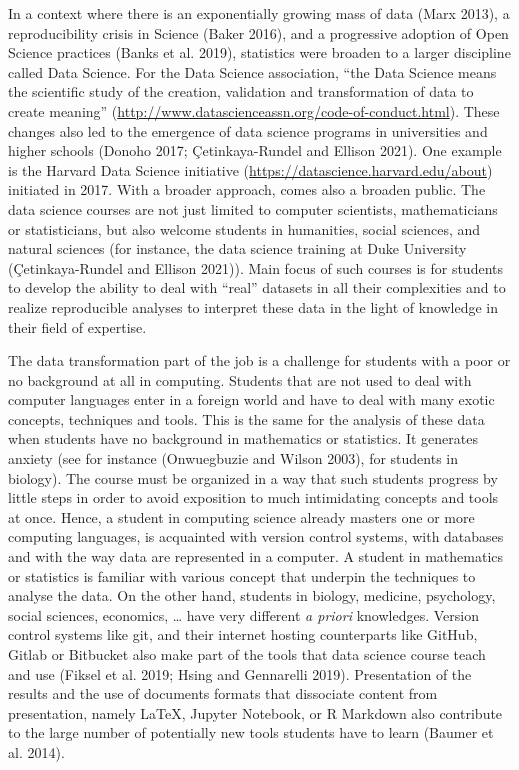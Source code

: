 \documentclass[
]{article}
\begin{document}
In a context where there is an exponentially growing mass of data (Marx
2013), a reproducibility crisis in Science (Baker 2016), and a
progressive adoption of Open Science practices (Banks et al. 2019),
statistics were broaden to a larger discipline called Data Science. For
the Data Science association, ``the Data Science means the scientific
study of the creation, validation and transformation of data to create
meaning'' (\url{http://www.datascienceassn.org/code-of-conduct.html}).
These changes also led to the emergence of data science programs in
universities and higher schools (Donoho 2017; Çetinkaya-Rundel and
Ellison 2021). One example is the Harvard Data Science initiative
(\url{https://datascience.harvard.edu/about}) initiated in 2017. With a
broader approach, comes also a broaden public. The data science courses
are not just limited to computer scientists, mathematicians or
statisticians, but also welcome students in humanities, social sciences,
and natural sciences (for instance, the data science training at Duke
University (Çetinkaya-Rundel and Ellison 2021)). Main focus of such
courses is for students to develop the ability to deal with ``real''
datasets in all their complexities and to realize reproducible analyses
to interpret these data in the light of knowledge in their field of
expertise.

The data transformation part of the job is a challenge for students with
a poor or no background at all in computing. Students that are not used
to deal with computer languages enter in a foreign world and have to
deal with many exotic concepts, techniques and tools. This is the same
for the analysis of these data when students have no background in
mathematics or statistics. It generates anxiety (see for instance
(Onwuegbuzie and Wilson 2003), for students in biology). The course must
be organized in a way that such students progress by little steps in
order to avoid exposition to much intimidating concepts and tools at
once. Hence, a student in computing science already masters one or more
computing languages, is acquainted with version control systems, with
databases and with the way data are represented in a computer. A student
in mathematics or statistics is familiar with various concept that
underpin the techniques to analyse the data. On the other hand, students
in biology, medicine, psychology, social sciences, economics, \ldots{}
have very different \emph{a priori} knowledges. Version control systems
like git, and their internet hosting counterparts like GitHub, Gitlab or
Bitbucket also make part of the tools that data science course teach and
use (Fiksel et al. 2019; Hsing and Gennarelli 2019). Presentation of the
results and the use of documents formats that dissociate content from
presentation, namely LaTeX, Jupyter Notebook, or R Markdown also
contribute to the large number of potentially new tools students have to
learn (Baumer et al. 2014).
\end{document}
